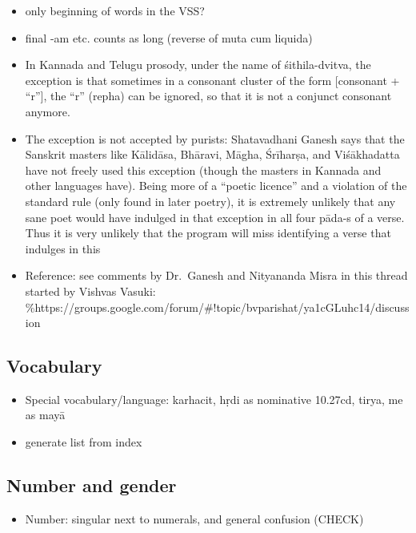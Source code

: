 \documentclass[]{article}
\providecommand{\tightlist}{%
  \setlength{\itemsep}{0pt}\setlength{\parskip}{0pt}}
\begin{document}
\begin{itemize}
\item
  only beginning of words in the VSS?
\item
  final -am etc. counts as long (reverse of muta cum liquida)
\item
  In Kannada and Telugu prosody, under the name of śithila-dvitva, the
  exception is that sometimes in a consonant cluster of the form
  {[}consonant + ``r''{]}, the ``r'' (repha) can be ignored, so that it
  is not a conjunct consonant anymore.
\item
  The exception is not accepted by purists: Shatavadhani Ganesh says
  that the Sanskrit masters like Kālidāsa, Bhāravi, Māgha, Śrīharṣa, and
  Viśākhadatta have not freely used this exception (though the masters
  in Kannada and other languages have). Being more of a ``poetic
  licence'' and a violation of the standard rule (only found in later
  poetry), it is extremely unlikely that any sane poet would have
  indulged in that exception in all four pāda-s of a verse. Thus it is
  very unlikely that the program will miss identifying a verse that
  indulges in this
\item
  Reference: see comments by Dr.~Ganesh and Nityananda Misra in this
  thread started by Vishvas Vasuki:
  \%https://groups.google.com/forum/\#!topic/bvparishat/ya1cGLuhc14/discussion
\end{itemize}

\hypertarget{vocabulary}{%
\subsection{Vocabulary}\label{vocabulary}}

\begin{itemize}
\tightlist
\item
  Special vocabulary/language: karhacit, hṛdi as nominative 10.27cd,
  tirya, me as mayā
\item
  generate list from index
\end{itemize}

\hypertarget{number-and-gender}{%
\subsection{Number and gender}\label{number-and-gender}}

\begin{itemize}
\tightlist
\item
  Number: singular next to numerals, and general confusion (CHECK)
\end{itemize}
\end{document}
